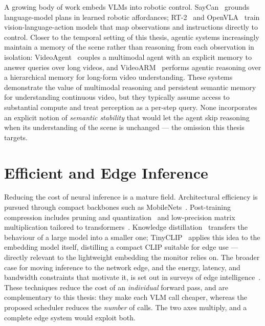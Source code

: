 A growing body of work embeds VLMs into robotic control. SayCan~\cite{Ahn2022SayCan}
grounds language-model plans in learned robotic affordances;
RT-2~\cite{Brohan2023RT2} and OpenVLA~\cite{Kim2024OpenVLA} train
vision-language-action models that map observations and instructions directly
to control. Closer to the temporal setting of this thesis, agentic systems
increasingly maintain a memory of the scene rather than reasoning from each
observation in isolation: VideoAgent~\cite{Wang2024VideoAgent} couples a
multimodal agent with an explicit memory to answer queries over long videos,
and VideoARM~\cite{CognitiveNav} performs agentic reasoning over a
hierarchical memory for long-form video understanding. These systems
demonstrate the value of multimodal reasoning and persistent semantic memory
for understanding continuous video, but they typically assume access to
substantial compute and treat perception as a per-step query. None incorporates an explicit notion of \emph{semantic
stability} that would let the agent skip reasoning when its understanding of
the scene is unchanged --- the omission this thesis targets.

\section{Efficient and Edge Inference}
\label{sec:lit-efficient}

Reducing the cost of neural inference is a mature field. Architectural
efficiency is pursued through compact backbones such as
MobileNets~\cite{Howard2017MobileNets}. Post-training compression includes
pruning and quantization~\cite{Han2016DeepCompression} and low-precision
matrix multiplication tailored to transformers~\cite{Dettmers2022LLMint8}.
Knowledge distillation~\cite{Hinton2015Distillation} transfers the behaviour
of a large model into a smaller one; TinyCLIP~\cite{Wu2023TinyCLIP} applies
this idea to the embedding model itself, distilling a compact CLIP suitable
for edge use --- directly relevant to the lightweight embedding the monitor
relies on. The broader case for moving inference to the network edge, and the
energy, latency, and bandwidth constraints that motivate it, is set out in
surveys of edge intelligence~\cite{Zhou2019EdgeIntelligence}. These techniques
reduce the cost of an \emph{individual} forward pass, and are complementary to
this thesis: they make each VLM call cheaper, whereas the proposed scheduler
reduces the \emph{number} of calls. The two axes multiply, and a complete edge
system would exploit both.

